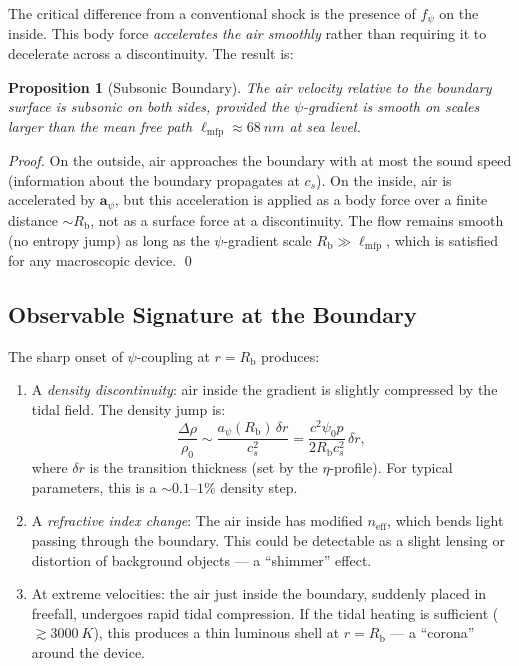 \documentclass[12pt, letterpaper]{article}
\newtheorem{proposition}{Proposition}
\theoremstyle{definition}
\theoremstyle{remark}
\newcommand{\neff}{n_{\mathrm{eff}}}
\newcommand{\avec}{\mathbf{a}}
\newcommand{\Rbub}{R_{\mathrm{b}}}
\newcommand{\cs}{c_s}
\begin{document}
The critical difference from a conventional shock is the presence of $f_\psi$
on the inside. This body force \emph{accelerates the air smoothly} rather than
requiring it to decelerate across a discontinuity. The result is:

\begin{proposition}[Subsonic Boundary]
\label{prop:subsonic-boundary}
The air velocity relative to the boundary surface is subsonic on both sides,
provided the $\psi$-gradient is smooth on scales larger than the mean free path
$\ell_{\mathrm{mfp}} \approx \SI{68}{nm}$ at sea level.
\end{proposition}

\begin{proof}
On the outside, air approaches the boundary with at most the sound speed
(information about the boundary propagates at $\cs$). On the inside, air
is accelerated by $\avec_\psi$, but this acceleration is applied as a body
force over a finite distance $\sim \Rbub$, not as a surface force at a
discontinuity. The flow remains smooth (no entropy jump) as long as the
$\psi$-gradient scale $\Rbub \gg \ell_{\mathrm{mfp}}$, which is satisfied
for any macroscopic device. \qed
\end{proof}

\subsection{Observable Signature at the Boundary}

The sharp onset of $\psi$-coupling at $r = \Rbub$ produces:
\begin{enumerate}
\item A \emph{density discontinuity}: air inside the gradient is slightly
compressed by the tidal field. The density jump is:
\begin{equation}
\frac{\Delta\rho}{\rho_0} \sim \frac{a_\psi(\Rbub)\,\delta r}{\cs^2}
= \frac{c^2\psi_0 p}{2\Rbub \cs^2}\,\delta r,
\end{equation}
where $\delta r$ is the transition thickness (set by the $\eta$-profile).
For typical parameters, this is a $\sim 0.1\text{--}1\%$ density step.

\item A \emph{refractive index change}: The air inside has modified $\neff$,
which bends light passing through the boundary. This could be detectable as a
slight lensing or distortion of background objects --- a ``shimmer'' effect.

\item At extreme velocities: the air just inside the boundary, suddenly placed
in freefall, undergoes rapid tidal compression. If the tidal heating is
sufficient ($\gtrsim \SI{3000}{K}$), this produces a thin luminous shell at
$r = \Rbub$ --- a ``corona'' around the device.
\end{enumerate}
\end{document}
